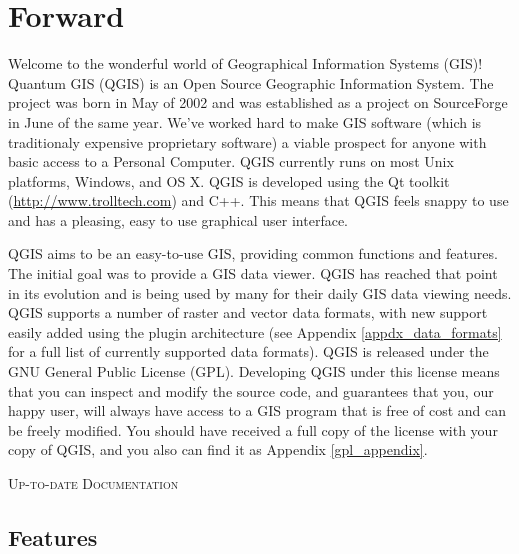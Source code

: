
\section{Forward}\label{label_forward}
\setcounter{page}{1}


Welcome to the wonderful world of Geographical Information Systems (GIS)!
Quantum GIS (QGIS) is an Open Source Geographic Information System. The project
was born in May of 2002 and was established as a project on SourceForge in June
of the same year. We've worked hard to make GIS software (which is traditionaly
expensive proprietary software) a viable prospect for anyone with basic access
to a Personal Computer. QGIS currently runs on most Unix platforms, Windows, and
OS X. QGIS is developed using the Qt toolkit (\url{http://www.trolltech.com})
and C++. This means that QGIS feels snappy to use and has a pleasing, easy to
use graphical user interface. 

QGIS aims to be an easy-to-use GIS, providing common functions and features.
The initial goal was to provide a GIS data viewer. QGIS has reached that point
in its evolution and is being used by many for their daily GIS data viewing
needs. QGIS supports a number of raster and vector data formats, with new
support easily added using the plugin architecture (see Appendix
\ref{appdx_data_formats} for a full list of currently supported data formats).
QGIS is released under the GNU General Public License (GPL). Developing QGIS 
under this license means that you can inspect and modify the source code,
and guarantees that you, our happy user, will always have access to a GIS
program that is free of cost and can be freely modified. You should have
received a full copy of the license with your copy of QGIS, and you also can
find it as Appendix \ref{gpl_appendix}.  

\begin{Tip}\caption{\textsc{Up-to-date Documentation}}
\end{Tip}

\subsection{Features}\label{label_majfeat}

